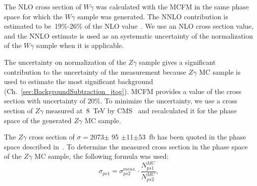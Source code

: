 The NLO cross section of $W\gamma$ was calculated with the MCFM in the same phase space for which the $W\gamma$ sample was generated. The NNLO contribution is estimated to be~19\%-26\% of the NLO value~\cite{ref_theory_NNLO}. We use an NLO cross section value, and the NNLO estimate is used as an systematic uncertainty of the normalization of the $W\gamma$ sample when it is applicable. 

The uncertainty on normalization of the $Z\gamma$ sample gives a significant contribution to the uncertainty of the measurement because $Z\gamma$ MC sample is used to estimate the most significant background (Ch.~\ref{sec:BackgroundSubtraction_jtog}). MCFM provides a value of the cross section with uncertainty of 20\%. To minimize the uncertainty, we use a cross section of $Z\gamma$ measured at~8~TeV by CMS~\cite{ref_Zg8TeV} and recalculated it for the phase space of the generated $Z\gamma$ MC sample. 

The $Z\gamma$ cross section of $\sigma = $2073$ \pm$ 95 $\pm$11$ \pm $53~fb has been quoted in the phase space described in~\cite{ref_Zg8TeV}. To determine the measured cross section in the phase space of the $Z\gamma$ MC sample, the following formula was used:
\begin{equation}
\sigma_{ps1} = \sigma_{ps2}^{meas.} \cdot \frac{N_{ps1}^{MC}}{N_{ps2}^{MC}},
\end{equation}


